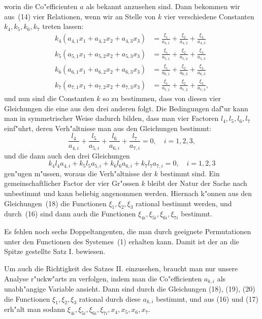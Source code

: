 \documentclass[12pt,a4paper]{article}
\theoremstyle{plain}
\begin{document}
worin die Co"efficienten $a$ als bekannt anzusehen sind. Dann bekommen wir aus~(14) vier Relationen, wenn wir an Stelle von $k$ vier verschiedene Constanten $k_4, k_5, k_6, k_7$ treten lassen:
\begin{equation}\tag{18}
\begin{aligned}
k_4(a_{4,1}x_1+a_{4,2}x_2+a_{4,3}x_3) &= \frac{\xi_1}{a_{4,1}}+\frac{\xi_2}{a_{4,2}}+\frac{\xi_3}{a_{4,3}}\\[4pt]
k_5(a_{5,1}x_1+a_{5,2}x_2+a_{5,3}x_3) &= \frac{\xi_1}{a_{5,1}}+\frac{\xi_2}{a_{5,2}}+\frac{\xi_3}{a_{5,3}}\\[4pt]
k_6(a_{6,1}x_1+a_{6,2}x_2+a_{6,3}x_3) &= \frac{\xi_1}{a_{6,1}}+\frac{\xi_2}{a_{6,2}}+\frac{\xi_3}{a_{6,3}}\\[4pt]
k_7(a_{7,1}x_1+a_{7,2}x_2+a_{7,3}x_3) &= \frac{\xi_1}{a_{7,1}}+\frac{\xi_2}{a_{7,2}}+\frac{\xi_3}{a_{7,3}},
\end{aligned}
\end{equation}
und nun sind die Constanten $k$ so zu bestimmen, dass von diesen vier Gleichungen die eine aus den drei anderen folgt. Die Bedingungen daf"ur kann man in symmetrischer Weise dadurch bilden, dass man vier Factoren $l_4, l_5, l_6, l_7$ einf"uhrt, deren Verh"altnisse man aus den Gleichungen bestimmt:
\begin{equation}\tag{19}
\frac{l_4}{a_{4,i}}+\frac{l_5}{a_{5,i}}+\frac{l_6}{a_{6,i}}+\frac{l_7}{a_{7,i}}=0, \quad i=1,2,3,
\end{equation}
und die dann auch den drei Gleichungen
\begin{equation}\tag{20}
k_4l_4a_{4,i}+k_5l_5a_{5,i}+k_6l_6a_{6,i}+k_7l_7a_{7,i}=0, \quad i=1,2,3
\end{equation}
gen"ugen m"ussen, woraus die Verh"altnisse der $k$ bestimmt sind. Ein gemeinschaftlicher Factor der vier Gr"ossen $k$ bleibt der Natur der Sache nach unbestimmt und kann beliebig angenommen werden. Hiernach k"onnen aus den Gleichungen~(18) die Functionen $\xi_1, \xi_2, \xi_3$ rational bestimmt werden, und durch~(16) sind dann auch die Functionen $\xi_{4i}, \xi_{5i}, \xi_{6i}, \xi_{7i}$ bestimmt.

Es fehlen noch sechs Doppeltangenten, die man durch geeignete Permutationen unter den Functionen des Systemes~(1) erhalten kann. Damit ist der an die Spitze gestellte Satz I. bewiesen.

Um auch die Richtigkeit des Satzes II. einzusehen, braucht man nur unsere Analyse r"uckw"arts zu verfolgen, indem man die Co"efficienten $a_{k,i}$ als unabh"angige Variable ansieht. Dann sind durch die Gleichungen (18), (19), (20) die Functionen $\xi_1, \xi_2, \xi_3$ rational durch diese $a_{k,i}$ bestimmt, und aus (16) und (17) erh"alt man sodann $\xi_{4i}, \xi_{5i}, \xi_{6i}, \xi_{7i}, x_4, x_5, x_6, x_7$.
\end{document}
